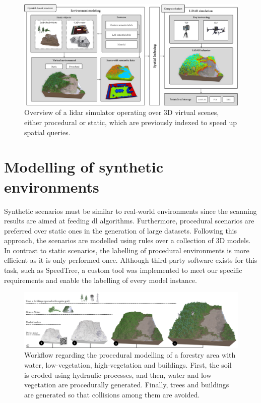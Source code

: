 \begin{figure}
    \centering
    \includegraphics[width=\linewidth]{figs/lidar_simulation/overview.png}
	\caption{Overview of a \acrshort{lidar} simulator operating over 3D virtual scenes, either procedural or static, which are previously indexed to speed up spatial queries. }
	\label{fig:lidar_overview}
\end{figure}

\section{Modelling of synthetic environments}

Synthetic scenarios must be similar to real-world environments since the scanning results are aimed at feeding \acrshort{dl} algorithms. Furthermore, procedural scenarios are preferred over static ones in the generation of large datasets. Following this approach, the scenarios are modelled using rules over a collection of 3D models. In contrast to static scenarios, the labelling of procedural environments is more efficient as it is only performed once. Although third-party software exists for this task, such as SpeedTree\textregistered, a custom tool was implemented to meet our specific requirements and enable the labelling of every model instance. 

\begin{figure}
    \centering
    \includegraphics[width=\linewidth]{figs/lidar_simulation/procedural_workflow.png}
	\caption{Workflow regarding the procedural modelling of a forestry area with water, low-vegetation, high-vegetation and buildings. First, the soil is eroded using hydraulic processes, and then, water and low vegetation are procedurally generated. Finally, trees and buildings are generated so that collisions among them are avoided. }
	\label{fig:procedural_workflow}
\end{figure}

